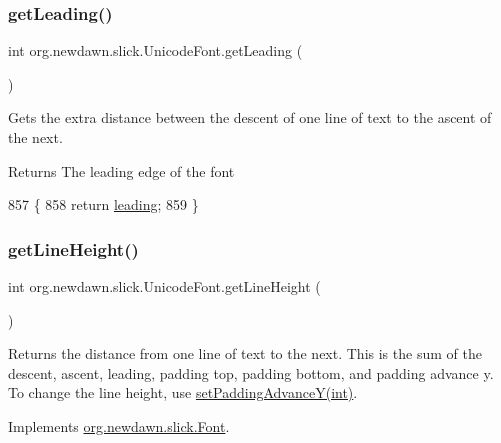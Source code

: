 \subsubsection{\texorpdfstring{get\+Leading()}{getLeading()}}
{\footnotesize\ttfamily int org.\+newdawn.\+slick.\+Unicode\+Font.\+get\+Leading (\begin{DoxyParamCaption}{ }\end{DoxyParamCaption})\hspace{0.3cm}{\ttfamily [inline]}}

Gets the extra distance between the descent of one line of text to the ascent of the next.

\begin{DoxyReturn}{Returns}
The leading edge of the font 
\end{DoxyReturn}

\begin{DoxyCode}
857                              \{
858         \textcolor{keywordflow}{return} \mbox{\hyperlink{classorg_1_1newdawn_1_1slick_1_1_unicode_font_a2288222beb428489eccae8d71f278e37}{leading}};
859     \}
\end{DoxyCode}
\mbox{\label{classorg_1_1newdawn_1_1slick_1_1_unicode_font_a4f245d11a64ccc71aa9b1d48d89cbc09}} 
\subsubsection{\texorpdfstring{get\+Line\+Height()}{getLineHeight()}}
{\footnotesize\ttfamily int org.\+newdawn.\+slick.\+Unicode\+Font.\+get\+Line\+Height (\begin{DoxyParamCaption}{ }\end{DoxyParamCaption})\hspace{0.3cm}{\ttfamily [inline]}}

Returns the distance from one line of text to the next. This is the sum of the descent, ascent, leading, padding top, padding bottom, and padding advance y. To change the line height, use \mbox{\hyperlink{classorg_1_1newdawn_1_1slick_1_1_unicode_font_ad10b4bc614f7e2b66e650726918940b2}{set\+Padding\+Advance\+Y(int)}}. 

Implements \mbox{\hyperlink{interfaceorg_1_1newdawn_1_1slick_1_1_font_aeb4b7770f47c5e2631d84b35924376d7}{org.\+newdawn.\+slick.\+Font}}.


